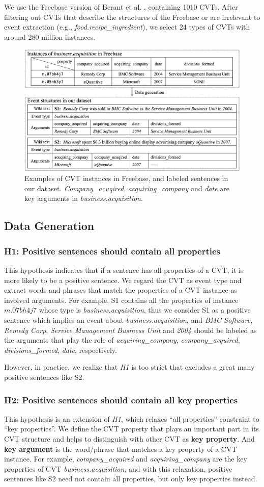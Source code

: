 We use the Freebase version of Berant et al. , containing 1010 CVTs. After filtering out CVTs that describe the structures of the Freebase or are irrelevant to event extraction (e.g., \emph{food.recipe\_ingredient}), we select 24 types of CVTs with around 280 million instances.

\begin{figure}[h]
	\centering
	\includegraphics[width=.48\textwidth]{temp}
	\caption{Examples of CVT instances in Freebase, and labeled sentences in our dataset. \emph{Company\_acuqired}, \emph{acquiring\_company} and \emph{date} are key arguments in \emph{business.acquisition}. \label{fig:3}}
\end{figure}

\subsection{Data Generation\label{datagen}}
\subsubsection{H1: Positive sentences should contain all properties}
This hypothesis indicates that if a sentence has all properties of a CVT, it is more likely to be a positive sentence. We regard the CVT as event type and extract words and phrases that match the properties of a CVT instance as involved arguments. For example, S1 contains all the properties of instance $m.07bh4j7$ whose type is \emph{business.acquisition}, thus we consider S1 as a positive sentence which implies an event about \emph{business.acquisition}, and \emph{BMC Software}, \emph{Remedy Corp}, \emph{Service Management Business Unit} and \emph{2004} should be labeled as the arguments that play the role of \emph{acquiring\_company}, \emph{company\_acquired}, \emph{divisions\_formed}, \emph{date}, respectively.

However, in practice, we realize that \emph{H1} is too strict that excludes a great many positive sentences like S2. 

\subsubsection{H2: Positive sentences should contain all key properties}
This hypothesis is an extension of \emph{H1}, which relaxes ``all properties'' constraint to ``key properties''. We define the CVT property that plays an important part in its CVT structure and helps to distinguish with other CVT as \textbf{key property}. And \textbf{key argument} is the word/phrase that matches a key property of a CVT instance. For example, \emph{company\_acquired} and \emph{acquiring\_company} are the key properties of CVT \emph{business.acquisition}, and with this relaxation, positive sentences like S2 need not contain all properties, but only key properties instead.

